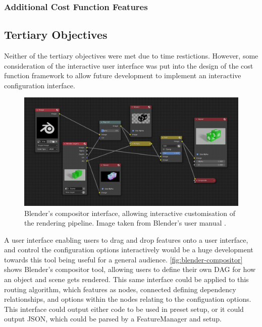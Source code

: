 \documentclass[12pt]{article}
\begin{document}
\subsubsection{Additional Cost Function Features}

\subsection{Tertiary Objectives}

Neither of the tertiary objectives were met due to time restictions. However, some consideration of the interactive user interface was put into the design of the cost function framework to allow future development to implement an interactive configuration interface.

\begin{figure}[!htbp]
  \centering
  \includegraphics[width=\textwidth]{assets/blender-compositor.png}
  \caption{Blender's compositor interface, allowing interactive customisation of the rendering pipeline. Image taken from Blender's user manual \autocite{blenderCompositor}.}
  \label{fig:blender-compositor}
\end{figure}

A user interface enabling users to drag and drop features onto a user interface, and control the configuration options interactively would be a huge development towards this tool being useful for a general audience. \autoref{fig:blender-compositor} shows Blender's compositor tool, allowing users to define their own DAG for how an object and scene gets rendered. This same interface could be applied to this routing algorithm, which features as nodes, connected defining dependency relationships, and options within the nodes relating to the configuation options. This interface could output either code to be used in preset setup, or it could output JSON, which could be parsed by a FeatureManager and setup.
\end{document}
